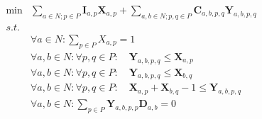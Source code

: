 \begin{align}
	\nonumber \min & \sum_{a \in N; p \in P} \mathbf{I}_{a,p}\mathbf{X}_{a,p} + \sum_{a,b \in N; p,q \in P} \mathbf{C}_{a,b,p,q}\mathbf{Y}_{a,b,p,q} \\
	\nonumber s.t. &  \\
	\nonumber & \forall a \in N : \sum_{p \in P}X_{a,p} = 1 \\
	\nonumber & \forall a,b \in N : \forall p,q \in P : \quad \mathbf{Y}_{a,b,p,q} \leq \mathbf{X}_{a,p} \\
	\nonumber & \forall a,b \in N : \forall p,q \in P : \quad \mathbf{Y}_{a,b,p,q} \leq \mathbf{X}_{b,q} \\
	\nonumber & \forall a,b \in N : \forall p,q \in P : \quad \mathbf{X}_{a,p} + \mathbf{X}_{b,q} - 1 \leq \mathbf{Y}_{a,b,p,q} \\
	\nonumber & \forall a,b \in N : \sum_{p \in P}\mathbf{Y}_{a,b,p,p}\mathbf{D}_{a,b} = 0
\end{align}